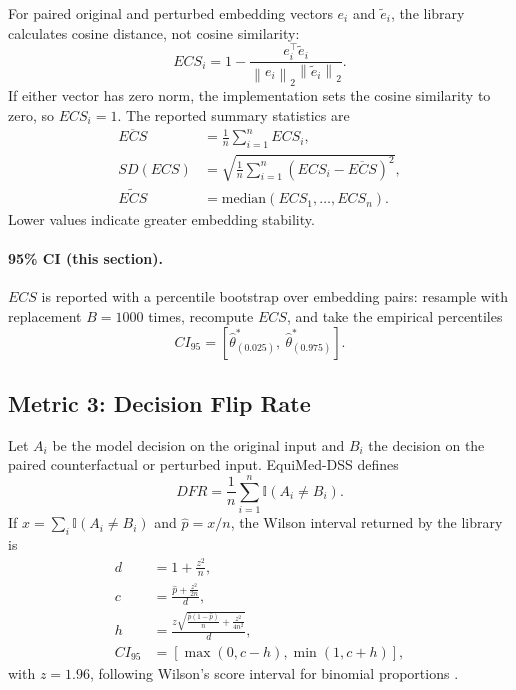 \documentclass[11pt]{article}
\newcommand{\ind}{\mathbb{I}}
\newcommand{\norm}[1]{\left\lVert #1 \right\rVert}
\begin{document}
For paired original and perturbed embedding vectors $e_i$ and $\tilde e_i$, the
library calculates cosine distance, not cosine similarity:
\begin{equation}
ECS_i = 1-\frac{e_i^\top \tilde e_i}{\norm{e_i}_2\norm{\tilde e_i}_2}.
\end{equation}
If either vector has zero norm, the implementation sets the cosine similarity
to zero, so $ECS_i=1$. The reported summary statistics are
\begin{align}
\overline{ECS} &= \frac{1}{n}\sum_{i=1}^{n}ECS_i,\\
SD(ECS) &= \sqrt{\frac{1}{n}\sum_{i=1}^{n}(ECS_i-\overline{ECS})^2},\\
\widetilde{ECS} &= \mathrm{median}(ECS_1,\ldots,ECS_n).
\end{align}
Lower values indicate greater embedding stability.


\paragraph{95\% CI (this section).} $ECS$ is reported with a percentile bootstrap over embedding pairs: resample with replacement $B=1000$ times, recompute $ECS$, and take the empirical percentiles
\begin{equation}
CI_{95}=\left[\hat\theta^{\ast}_{(0.025)},\ \hat\theta^{\ast}_{(0.975)}\right].
\end{equation}

\subsection{Metric 3: Decision Flip Rate}

Let $A_i$ be the model decision on the original input and $B_i$ the decision on
the paired counterfactual or perturbed input. EquiMed-DSS defines
\begin{equation}
DFR = \frac{1}{n}\sum_{i=1}^{n}\ind(A_i\ne B_i).
\end{equation}
If $x=\sum_i\ind(A_i\ne B_i)$ and $\hat p=x/n$, the Wilson interval returned by
the library is
\begin{align}
d &= 1+\frac{z^2}{n},\\
c &= \frac{\hat p+\frac{z^2}{2n}}{d},\\
h &= \frac{z\sqrt{\frac{\hat p(1-\hat p)}{n}+\frac{z^2}{4n^2}}}{d},\\
CI_{95} &= [\max(0,c-h),\min(1,c+h)],
\end{align}
with $z=1.96$, following Wilson's score interval for binomial proportions
\cite{wilson1927}.
\end{document}
